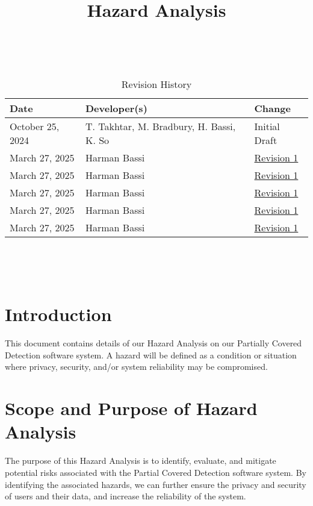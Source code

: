 \documentclass{article}
\title{Hazard Analysis\\\progname}
\author{\authname}
\date{}
\begin{document}
\maketitle
\thispagestyle{empty}

~\newpage


\begin{table}[hp]
\caption{Revision History} \label{TblRevisionHistory}
\begin{tabularx}{\textwidth}{llX}
\toprule
\textbf{Date} & \textbf{Developer(s)} & \textbf{Change}\\
\midrule
October 25, 2024 & T. Takhtar, M. Bradbury, H. Bassi, K. So & Initial Draft\\
March 27, 2025 & Harman Bassi & \href{https://github.com/takhtart/PCD/issues/92}{Revision 1}\\
March 27, 2025 & Harman Bassi & \href{https://github.com/takhtart/PCD/issues/93}{Revision 1}\\
March 27, 2025 & Harman Bassi & \href{https://github.com/takhtart/PCD/issues/94}{Revision 1}\\
March 27, 2025 & Harman Bassi & \href{https://github.com/takhtart/PCD/issues/95}{Revision 1}\\
March 27, 2025 & Harman Bassi & \href{https://github.com/takhtart/PCD/issues/96}{Revision 1}\\
\bottomrule
\end{tabularx}
\end{table}

~\newpage

\tableofcontents

~\newpage


\section{Introduction}

This document contains details of our Hazard Analysis on our Partially Covered Detection software system. 
A hazard will be defined as a condition or situation where privacy, security, and/or system reliability may be compromised.

\section{Scope and Purpose of Hazard Analysis}

The purpose of this Hazard Analysis is to identify, evaluate, and mitigate potential risks associated with the 
Partial Covered Detection software system. By identifying the associated hazards, we can further ensure the privacy 
and security of users and their data, and increase the reliability of the system.
\end{document}
